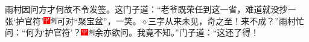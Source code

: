 雨村因问方才何故不令发签。这门子道：“老爷既荣任到这一省，难道就没抄一张‘护官符’{\includegraphics[width=3mm]{../Images/00002}\includegraphics[width=3mm]{../Images/00011}\footnotesize \kaishu 可对“聚宝盆”，一笑。{$\diamond$}三字从来未见，奇之至！}来不成？”雨村忙问：“何为‘护官符’？{\includegraphics[width=3mm]{../Images/00002}\includegraphics[width=3mm]{../Images/00011}\footnotesize \kaishu 余亦欲问。}我竟不知。”门子道：“这还了得！